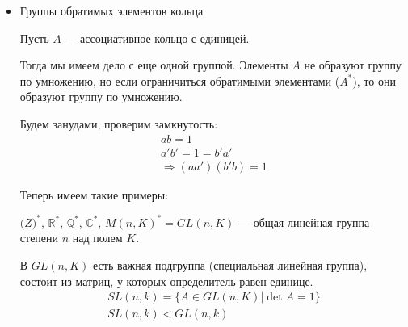 \begin{itemize}
Из курса дискретной математики известно, что замена представителей классов на других представителей тех же классов не влияет на результат операций.

\begin{theorem}
  $(\mathbb{Z}/m \mathbb{Z}, +, \cdot)$ --- коммутативное ассоциативное кольцо с единицей.

  \begin{proof}
    Рутинная проверка, тривиально.
  \end{proof}
\end{theorem}

\notice
Можно обобщить построение кольца классов вычетов до любого коммутативного кольца. 

$R$ --- коммутативное кольцо, $f\in R$, $\stackrel{f}{\equiv}$ --- отношение сравнимости по модулю элемента $f$.

$R/(f) = R/\stackrel{f}{\equiv}$ --- факторкольцо. 

В частности можно самостоятельно обдумать такое: 

\begin{itemize}
  \item $\mathbb{R}[X]/(X^2 + 1)$ --- легко отождествляется с полем комплексных чисел. 
  \item $R$ --- коммутативное кольцо, $I\subset R$ --- идеал в нем. Тогда $a \stackrel{I}{\equiv} b \Leftrightarrow a - b \in I$
\end{itemize} 

\item Группы обратимых элементов кольца

Пусть $A$ --- ассоциативное кольцо с единицей. 

Тогда мы имеем дело с еще одной группой. Элементы $A$ не образуют группу по умножению, но если ограничиться обратимыми элементами ($A^*$), то они образуют группу по умножению. 

Будем занудами, проверим замкнутость: 
\begin{gather*}
  ab = 1 \\
  a'b' = 1 = b'a' \\
  \Rightarrow (aa')(b'b) = 1  
\end{gather*}

Теперь имеем такие примеры: 

$\mathbb(Z)^*$, $\mathbb{R}^*$, $\mathbb{Q}^*$, $\mathbb{C}^*$, $M(n, K)^* = GL(n, K)$ --- общая линейная группа степени $n$ над полем $K$.

В $GL(n, K)$ есть важная подгруппа (специальная линейная группа), состоит из матриц, у которых определитель равен единице. 
\begin{gather*}
  SL(n, k) = \{ A \in GL(n, K) | \det{A} = 1 \} \\
  SL(n, k) < GL(n, k)
\end{gather*}


\end{itemize}
